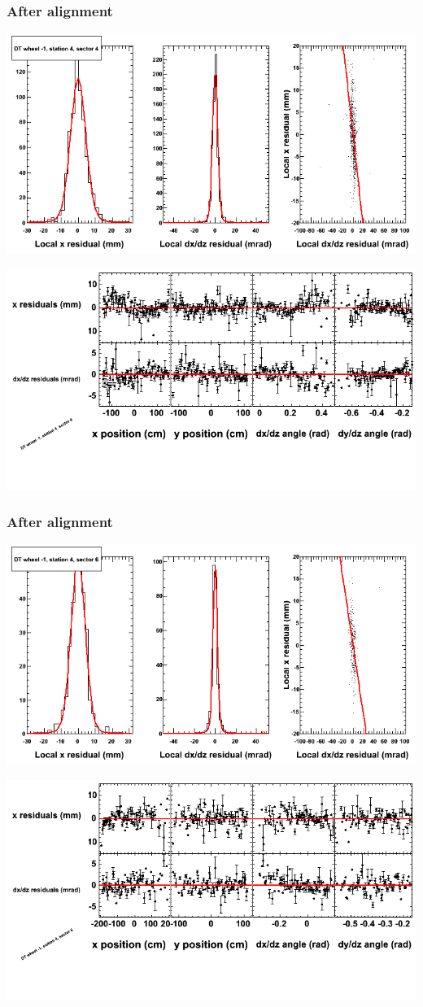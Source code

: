 \documentclass[compress]{beamer}
\begin{document}
\begin{frame}
\frametitle{After alignment}
\includegraphics[width=0.7\linewidth]{NOV4_fitfunctions/MBwhBst4sec04_bellcurves.png}

\includegraphics[width=0.7\linewidth]{NOV4_fitfunctions/MBwhBst4sec04_polynomials.png}
\end{frame}

\begin{frame}
\frametitle{After alignment}
\includegraphics[width=0.7\linewidth]{NOV4_fitfunctions/MBwhBst4sec06_bellcurves.png}

\includegraphics[width=0.7\linewidth]{NOV4_fitfunctions/MBwhBst4sec06_polynomials.png}
\end{frame}
\end{document}
